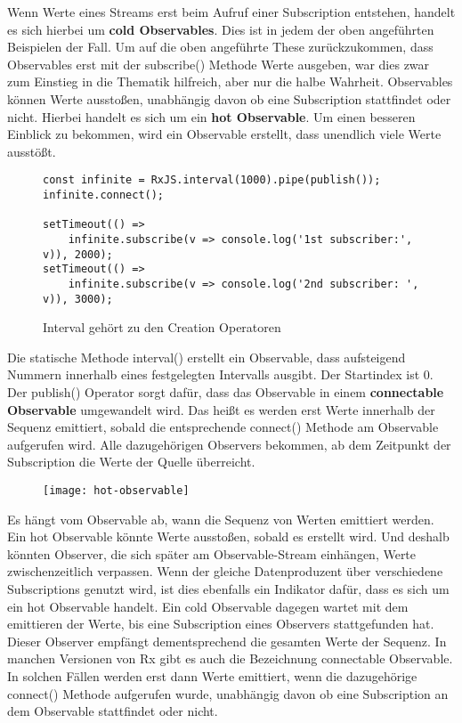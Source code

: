 \noindent
Wenn Werte eines Streams erst beim Aufruf einer Subscription entstehen, handelt es sich hierbei um \textbf{cold Observables}.\cite{hot-vs-cold} Dies ist in jedem der oben angeführten Beispielen der Fall. Um auf die oben angeführte These zurückzukommen, dass Observables erst mit der subscribe() Methode Werte ausgeben, war dies zwar zum Einstieg in die Thematik hilfreich, aber nur die halbe Wahrheit. Observables können Werte ausstoßen, unabhängig davon ob eine Subscription stattfindet oder nicht. Hierbei handelt es sich um ein \textbf{hot Observable}. Um einen besseren Einblick zu bekommen, wird ein Observable erstellt, dass unendlich viele Werte ausstößt.

\begin{figure}[H]
\begin{lstlisting}[basicstyle=\small]
const infinite = RxJS.interval(1000).pipe(publish());
infinite.connect();

setTimeout(() =>
    infinite.subscribe(v => console.log('1st subscriber:', v)), 2000);
setTimeout(() =>
    infinite.subscribe(v => console.log('2nd subscriber: ', v)), 3000);
\end{lstlisting}
\caption{Interval gehört zu den Creation Operatoren}
\end{figure}

\noindent
Die statische Methode interval() erstellt ein Observable, dass aufsteigend Nummern innerhalb eines festgelegten Intervalls ausgibt. Der Startindex ist 0. Der publish() Operator sorgt dafür, dass das Observable in einem \textbf{connectable Observable} umgewandelt wird. Das heißt es werden erst Werte innerhalb der Sequenz emittiert, sobald die entsprechende connect() Methode am Observable aufgerufen wird. Alle dazugehörigen Observers bekommen, ab dem Zeitpunkt der Subscription die Werte der Quelle überreicht.\\

\begin{figure}[H]
\begin{center}
\texttt{[image: hot-observable]}
\end{center}
\end{figure}

\noindent
Es hängt vom Observable ab, wann die Sequenz von Werten emittiert werden. Ein hot Observable könnte Werte ausstoßen, sobald es erstellt wird. Und deshalb könnten Observer, die sich später am Observable-Stream einhängen, Werte zwischenzeitlich verpassen. Wenn der gleiche Datenproduzent über verschiedene Subscriptions genutzt wird, ist dies ebenfalls ein Indikator dafür, dass es sich um ein hot Observable handelt. Ein cold Observable dagegen wartet mit dem emittieren der Werte, bis eine Subscription eines Observers stattgefunden hat. Dieser Observer empfängt dementsprechend die gesamten Werte der Sequenz. In manchen Versionen von Rx gibt es auch die Bezeichnung connectable Observable. In solchen Fällen werden erst dann Werte emittiert, wenn die dazugehörige connect() Methode aufgerufen wurde, unabhängig davon ob eine Subscription an dem Observable stattfindet oder nicht.\cite{hot-vs-cold-part-2}

